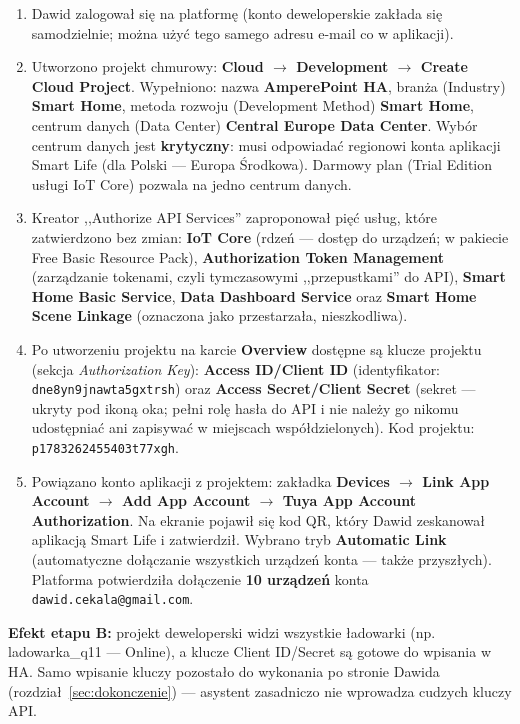 \documentclass[11pt,a4paper]{article}
\begin{document}
\begin{enumerate}
\item Dawid zalogował się na platformę (konto deweloperskie zakłada się samodzielnie; można użyć tego samego adresu e-mail co w aplikacji).
\item Utworzono projekt chmurowy: \textbf{Cloud $\to$ Development $\to$ Create Cloud Project}. Wypełniono: nazwa \textbf{AmperePoint HA}, branża (Industry) \textbf{Smart Home}, metoda rozwoju (Development Method) \textbf{Smart Home}, centrum danych (Data Center) \textbf{Central Europe Data Center}. Wybór centrum danych jest \textbf{krytyczny}: musi odpowiadać regionowi konta aplikacji Smart Life (dla Polski --- Europa Środkowa). Darmowy plan (Trial Edition usługi IoT Core) pozwala na jedno centrum danych.
\item Kreator ,,Authorize API Services'' zaproponował pięć usług, które zatwierdzono bez zmian: \textbf{IoT Core} (rdzeń --- dostęp do urządzeń; w pakiecie Free Basic Resource Pack), \textbf{Authorization Token Management} (zarządzanie tokenami, czyli tymczasowymi ,,przepustkami'' do API), \textbf{Smart Home Basic Service}, \textbf{Data Dashboard Service} oraz \textbf{Smart Home Scene Linkage} (oznaczona jako przestarzała, nieszkodliwa).
\item Po utworzeniu projektu na karcie \textbf{Overview} dostępne są klucze projektu (sekcja \emph{Authorization Key}): \textbf{Access ID/Client ID} (identyfikator: \texttt{dne8yn9jnawta5gxtrsh}) oraz \textbf{Access Secret/Client Secret} (sekret --- ukryty pod ikoną oka; pełni rolę hasła do API i nie należy go nikomu udostępniać ani zapisywać w miejscach współdzielonych). Kod projektu: \texttt{p1783262455403t77xgh}.
\item Powiązano konto aplikacji z projektem: zakładka \textbf{Devices $\to$ Link App Account $\to$ Add App Account $\to$ Tuya App Account Authorization}. Na ekranie pojawił się kod QR, który Dawid zeskanował aplikacją Smart Life i zatwierdził. Wybrano tryb \textbf{Automatic Link} (automatyczne dołączanie wszystkich urządzeń konta --- także przyszłych). Platforma potwierdziła dołączenie \textbf{10 urządzeń} konta \texttt{dawid.cekala@gmail.com}.
\end{enumerate}

\textbf{Efekt etapu B:} projekt deweloperski widzi wszystkie ładowarki (np. ladowarka\_q11 --- Online), a klucze Client ID/Secret są gotowe do wpisania w HA. Samo wpisanie kluczy pozostało do wykonania po stronie Dawida (rozdział~\ref{sec:dokonczenie}) --- asystent zasadniczo nie wprowadza cudzych kluczy API.
\end{document}
